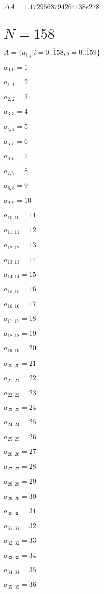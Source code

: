 \documentclass[a4paper,12pt]{article}
\begin{document}
$\Delta A = 1.1729568794264138e278$



\section{ $N = 158$ }
$A = \{ a _{ i, j } | i = \overline { 0..158 }, j = \overline { 0..159 } \}$

$a _{ 0, 0 } = 1$

$a _{ 1, 1 } = 2$

$a _{ 2, 2 } = 3$

$a _{ 3, 3 } = 4$

$a _{ 4, 4 } = 5$

$a _{ 5, 5 } = 6$

$a _{ 6, 6 } = 7$

$a _{ 7, 7 } = 8$

$a _{ 8, 8 } = 9$

$a _{ 9, 9 } = 10$

$a _{ 10, 10 } = 11$

$a _{ 11, 11 } = 12$

$a _{ 12, 12 } = 13$

$a _{ 13, 13 } = 14$

$a _{ 14, 14 } = 15$

$a _{ 15, 15 } = 16$

$a _{ 16, 16 } = 17$

$a _{ 17, 17 } = 18$

$a _{ 18, 18 } = 19$

$a _{ 19, 19 } = 20$

$a _{ 20, 20 } = 21$

$a _{ 21, 21 } = 22$

$a _{ 22, 22 } = 23$

$a _{ 23, 23 } = 24$

$a _{ 24, 24 } = 25$

$a _{ 25, 25 } = 26$

$a _{ 26, 26 } = 27$

$a _{ 27, 27 } = 28$

$a _{ 28, 28 } = 29$

$a _{ 29, 29 } = 30$

$a _{ 30, 30 } = 31$

$a _{ 31, 31 } = 32$

$a _{ 32, 32 } = 33$

$a _{ 33, 33 } = 34$

$a _{ 34, 34 } = 35$

$a _{ 35, 35 } = 36$
\end{document}
